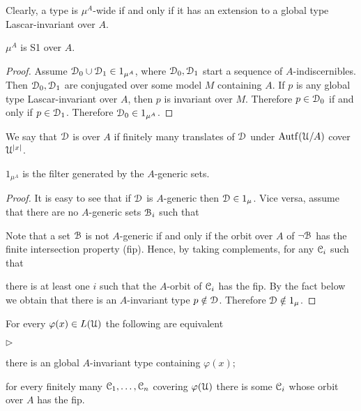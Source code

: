 \documentclass{amsproc}
\newcommand{\mylabel}[1]{{#1}\hfill}
\renewenvironment{itemize}
  {\begin{list}{$\triangleright$}{%
  \setlength{\parskip}{0mm}
  \setlength{\topsep}{.4\baselineskip}
  \setlength{\rightmargin}{0mm}
  \setlength{\listparindent}{0mm}
  \setlength{\itemindent}{0mm}
  \setlength{\labelwidth}{3ex}
  \setlength{\itemsep}{.2\baselineskip}
  \setlength{\parsep}{.2\baselineskip}
  \setlength{\partopsep}{0mm}
  \setlength{\labelsep}{1ex}
  \setlength{\leftmargin}{\labelwidth+\labelsep}
  \let\makelabel\mylabel}}{%
\end{list}}
\renewcommand*{\emph}[1]{%
   \smash{\tikz[baseline]\node[rectangle, fill=teal!25, rounded corners, inner xsep=0.5ex, inner ysep=0.2ex, anchor=base, minimum height = 2.7ex]{\strut #1};}}
\begin{document}
Clearly, a type is $\mu^A$-wide if and only if it has an extension to a global type Lascar-invariant over $A$.

\begin{lemma}
  $\mu^A$ is S1 over $A$.
\end{lemma}  

\begin{proof}
  Assume $\EuScript D_0\cup\EuScript D_1\in1_{\mu^A}$, where $\EuScript D_0,\EuScript D_1$ start a sequence of $A$-indiscernibles.
  Then $\EuScript D_0,\EuScript D_1$ are conjugated over some model $M$ containing $A$.
  If $p$ is any global type Lascar-invariant over $A$, then $p$ is invariant over $M$.
  Therefore $p\in\EuScript D_0$ if and only if $p\in\EuScript D_1$.
  Therefore $\EuScript D_0\in1_{\mu^A}$.
\end{proof}

We say that $\EuScript D$ is \emph{Lascar-generic\/} over $A$ if finitely many translates of $\EuScript D$ under ${\rm Autf}(\EuScript U/A)$ cover $\EuScript U^{|x|}$.

\begin{fact}
  $1_{\mu^A}$ is the filter generated by the $A$-generic sets.
\end{fact}
  
\begin{proof}
  It is easy to see that if $\EuScript D$ is $A$-generic then $\EuScript D\in1_\mu$.
  Vice versa, assume that there are no $A$-generic sets $\EuScript B_i$ such that 


  Note that a set $\EuScript B$ is not $A$-generic if and only if the orbit over $A$ of $\neg\EuScript B$ has the finite intersection property (fip).
  Hence, by taking complements, for any $\EuScript C_i$ such that 
  

  there is at least one $i$ such that the $A$-orbit of $\EuScript C_i$ has the fip.
  By the fact below we obtain that there is an $A$-invariant type $p\notin\EuScript D$.
  Therefore $\EuScript D\notin1_\mu$.
\end{proof}

\begin{fact}
  For every $\varphi(x)\in L(\EuScript U)$ the following are equivalent
  \begin{itemize}
    \item [1.] there is an global $A$-invariant type containing $\varphi(x)$;
    \item [2.] for every finitely many $\EuScript C_1,\dots,\EuScript C_n$ covering $\varphi(\EuScript U)$ there is some $\EuScript C_i$ whose orbit over $A$ has the fip.
  \end{itemize}
\end{fact}
\end{document}
